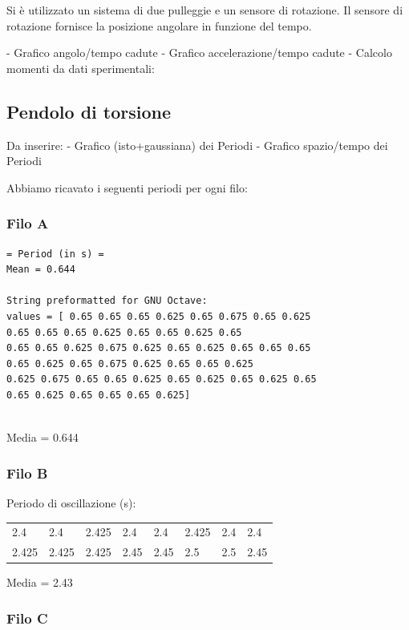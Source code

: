 \documentclass[a4paper,10pt]{report}
\begin{document}
Si è utilizzato un sistema di due pulleggie e un sensore di rotazione.
Il sensore di rotazione fornisce la posizione angolare in funzione del tempo. 



- Grafico angolo/tempo cadute
- Grafico accelerazione/tempo cadute
- Calcolo momenti da dati sperimentali:





\subsection{Pendolo di torsione}

Da inserire:
- Grafico (isto+gaussiana) dei Periodi
- Grafico spazio/tempo dei Periodi


Abbiamo ricavato i seguenti periodi per ogni filo:
\subsubsection{Filo A}

\begin{verbatim}
= Period (in s) =
Mean = 0.644

String preformatted for GNU Octave:
values = [ 0.65 0.65 0.65 0.625 0.65 0.675 0.65 0.625
0.65 0.65 0.65 0.625 0.65 0.65 0.625 0.65
0.65 0.65 0.625 0.675 0.625 0.65 0.625 0.65 0.65 0.65
0.65 0.625 0.65 0.675 0.625 0.65 0.65 0.625
0.625 0.675 0.65 0.65 0.625 0.65 0.625 0.65 0.625 0.65
0.65 0.625 0.65 0.65 0.65 0.625]


\end{verbatim}


Media = 0.644

\subsubsection{Filo B}
Periodo di oscillazione (s):

\begin{center}
\begin{tabular}{llllllll}
2.4   & 2.4   & 2.425 & 2.4  & 2.4   & 2.425 & 2.4  & 2.4 \\
2.425 & 2.425 & 2.425 & 2.45 & 2.45  & 2.5   & 2.5  & 2.45 \\
\end{tabular}
\end{center}
Media = 2.43

\subsubsection{Filo C}
\end{document}
